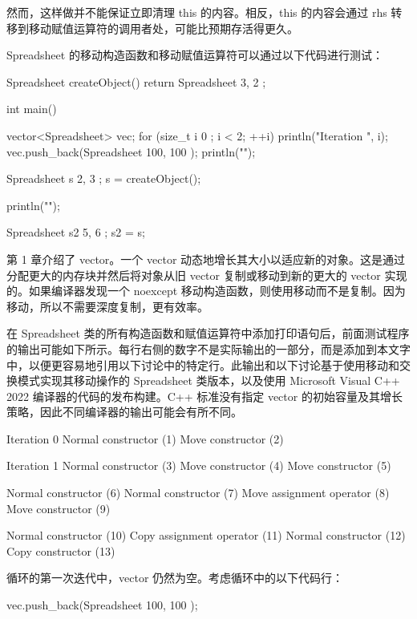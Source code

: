 然而，这样做并不能保证立即清理 this 的内容。相反，this 的内容会通过 rhs 转移到移动赋值运算符的调用者处，可能比预期存活得更久。


Spreadsheet 的移动构造函数和移动赋值运算符可以通过以下代码进行测试：

\begin{cpp}
Spreadsheet createObject()
{
    return Spreadsheet { 3, 2 };
}

int main()
{
    vector<Spreadsheet> vec;
    for (size_t i { 0 }; i < 2; ++i) {
        println("Iteration {}", i);
        vec.push_back(Spreadsheet { 100, 100 });
        println("");
    }

    Spreadsheet s { 2, 3 };
    s = createObject();

    println("");

    Spreadsheet s2 { 5, 6 };
    s2 = s;
}
\end{cpp}

第 1 章介绍了 vector。一个 vector 动态地增长其大小以适应新的对象。这是通过分配更大的内存块并然后将对象从旧 vector 复制或移动到新的更大的 vector 实现的。如果编译器发现一个 noexcept 移动构造函数，则使用移动而不是复制。因为移动，所以不需要深度复制，更有效率。

在 Spreadsheet 类的所有构造函数和赋值运算符中添加打印语句后，前面测试程序的输出可能如下所示。每行右侧的数字不是实际输出的一部分，而是添加到本文字中，以便更容易地引用以下讨论中的特定行。此输出和以下讨论基于使用移动和交换模式实现其移动操作的 Spreadsheet 类版本，以及使用 Microsoft Visual C++ 2022 编译器的代码的发布构建。C++ 标准没有指定 vector 的初始容量及其增长策略，因此不同编译器的输出可能会有所不同。

\begin{shell}
Iteration 0
Normal constructor          (1)
Move constructor            (2)

Iteration 1
Normal constructor          (3)
Move constructor            (4)
Move constructor            (5)

Normal constructor          (6)
Normal constructor          (7)
Move assignment operator    (8)
Move constructor            (9)

Normal constructor         (10)
Copy assignment operator   (11)
Normal constructor         (12)
Copy constructor           (13)
\end{shell}

循环的第一次迭代中，vector 仍然为空。考虑循环中的以下代码行：

\begin{cpp}
vec.push_back(Spreadsheet { 100, 100 });
\end{cpp}

